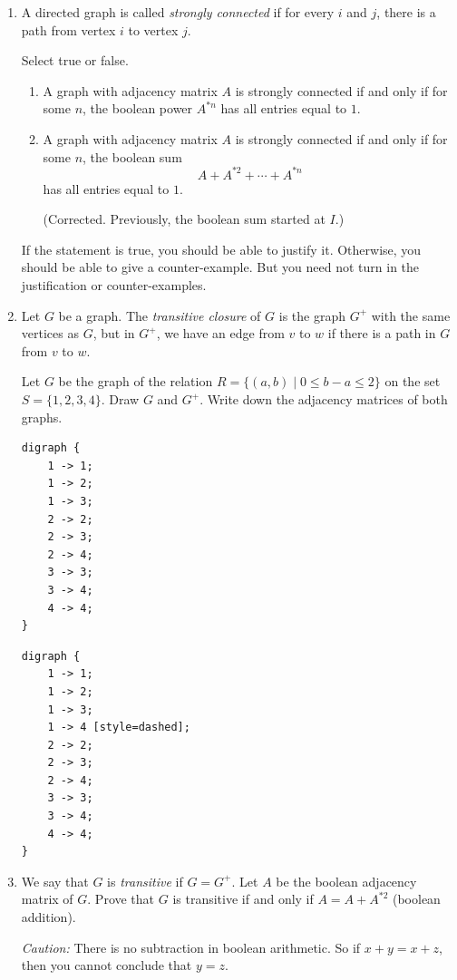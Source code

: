 \documentclass{amsart}
\begin{document}
\begin{enumerate}
\item A directed graph is called \emph{strongly connected} if for every \(i\) and \(j\), there is a path from vertex \(i\) to vertex \(j\).

Select true or false.  

\begin{enumerate}
\item A graph with adjacency matrix \(A\) is strongly connected if and only if for some \(n\), the boolean power \(A^{*n}\) has all entries equal to \(1\).
\item A graph with adjacency matrix \(A\) is strongly connected if and only if for some \(n\), the boolean sum
\[A +A^{*2} + \cdots + A^{*n}\]
 has all entries equal to \(1\).

(Corrected.  Previously, the boolean sum started at \(I\).)
\end{enumerate}

If the statement is true, you should be able to justify it.
Otherwise, you should be able to give a counter-example.
But you need not turn in the justification or counter-examples.

\item Let \(G\) be a graph.
The \emph{transitive closure} of \(G\) is the graph \(G^+\) with the same vertices as \(G\), but in \(G^{+}\), we have an edge from \(v\) to \(w\) if there is a path in \(G\) from \(v\) to \(w\).

Let \(G\) be the graph of the relation \(R = \{(a,b) \mid 0 \leq b - a \leq 2\}\) on the set \(S = \{1,2,3,4\}\).
Draw \(G\) and \(G^+\).
Write down the adjacency matrices of both graphs.
\begin{verbatim}
digraph {
    1 -> 1;
    1 -> 2;
    1 -> 3;
    2 -> 2;
    2 -> 3;
    2 -> 4;
    3 -> 3;
    3 -> 4;
    4 -> 4;
}
\end{verbatim}
\begin{verbatim}
digraph {
    1 -> 1;
    1 -> 2;
    1 -> 3;
    1 -> 4 [style=dashed];
    2 -> 2;
    2 -> 3;
    2 -> 4;
    3 -> 3;
    3 -> 4;
    4 -> 4;
}
\end{verbatim}

\item We say that \(G\) is \emph{transitive} if \(G = G^+\).
Let \(A\) be the boolean adjacency matrix of \(G\).
Prove that \(G\) is transitive if and only if \(A = A + A^{*2}\) (boolean addition).

\noindent
\emph{Caution:} There is no subtraction in boolean arithmetic.  So if \(x+y = x+z\), then you cannot conclude that \(y = z\).


\end{enumerate}
\end{document}
